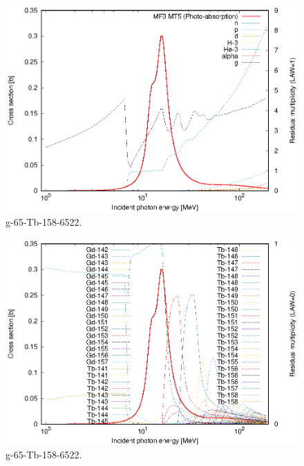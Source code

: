 \begin{figure}
 \includegraphics[width=\linewidth]{eps/g_65-Tb-158_6522.eps}
  \caption{g-65-Tb-158-6522.}
\end{figure}
\begin{figure}
 \includegraphics[width=\linewidth]{eps-law0/g_65-Tb-158_6522.eps}
 \caption{g-65-Tb-158-6522.}
\end{figure}
\newpage \clearpage

